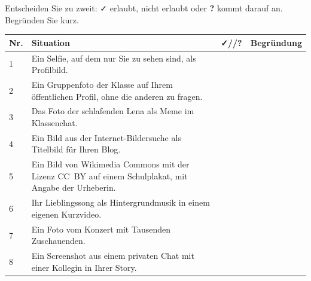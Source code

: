 \begin{myexercise}\label{ex:fallkarten}
	Entscheiden Sie zu zweit: \faCheck{} erlaubt, \faTimes{} nicht erlaubt oder \textbf{?} kommt darauf an. Begründen Sie kurz.

	\begin{center}
		\renewcommand{\arraystretch}{1.5}
		\small
		\begin{tabular}{p{0.6cm}p{7.4cm}cp{3.8cm}}
			\textbf{Nr.} & \textbf{Situation}                                                                                        & \textbf{\faCheck/\faTimes/?} & \textbf{Begründung} \\
			\midrule
			1            & Ein Selfie, auf dem nur Sie zu sehen sind, als Profilbild.                                                &                              &                     \\
			2            & Ein Gruppenfoto der Klasse auf Ihrem öffentlichen Profil, ohne die anderen zu fragen.                       &                              &                     \\
			3            & Das Foto der schlafenden Lena als Meme im Klassenchat.                                                    &                              &                     \\
			4            & Ein Bild aus der Internet-Bildersuche als Titelbild für Ihren Blog.                                       &                              &                     \\
			5            & Ein Bild von Wikimedia Commons mit der Lizenz \gls{CC}~BY auf einem Schulplakat, mit Angabe der Urheberin. &                              &                     \\
			6            & Ihr Lieblingssong als Hintergrundmusik in einem eigenen Kurzvideo.                                        &                              &                     \\
			7            & Ein Foto vom Konzert mit Tausenden Zuschauenden.                                                          &                              &                     \\
			8            & Ein Screenshot aus einem privaten Chat mit einer Kollegin in Ihrer Story.                                 &                              &                     \\
		\end{tabular}
	\end{center}


\end{myexercise}
